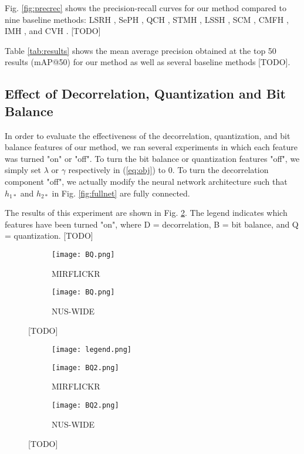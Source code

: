 \documentclass[letterpaper]{article}
\begin{document}
Fig. \ref{fig:precrec} shows the precision-recall curves for our method compared to nine baseline methods: LSRH \cite{kai}, SePH \cite{seph}, QCH \cite{qch}, STMH \cite{stmh}, LSSH \cite{lssh}, SCM \cite{scm}, CMFH \cite{cmfh}, IMH \cite{imh}, and CVH \cite{cvh}. [TODO]

Table \ref{tab:results} shows the mean average precision obtained at the top 50 results (mAP@50) for our method as well as several baseline methods [TODO]. 

\subsection{Effect of Decorrelation, Quantization and Bit Balance}

In order to evaluate the effectiveness of the decorrelation, quantization, and bit balance features of our method, we ran several experiments in which each feature was turned "on" or "off". To turn the bit balance or quantization features "off", we simply set $ \lambda $ or $ \gamma $ respectively in (\ref{eq:obj}) to 0. To turn the decorrelation component "off", we actually modify the neural network architecture such that $ h_{1*} $ and $ h_{2*} $ in Fig. \ref{fig:fullnet} are fully connected.

The results of this experiment are shown in Fig. \ref{fig:BQ2}. The legend indicates which features have been turned "on", where D = decorrelation, B = bit balance, and Q = quantization. [TODO]

\begin{figure}
	
	\begin{subfigure}{\columnwidth}
		\texttt{[image: BQ.png]}
		\caption{MIRFLICKR}
	\end{subfigure}
	\begin{subfigure}{\columnwidth}
		\texttt{[image: BQ.png]}
		\caption{NUS-WIDE}
	\end{subfigure}
	\caption{\label{fig:BQ}[TODO]}
	
\end{figure}

\begin{figure}
	
	\begin{subfigure}{\columnwidth}
		\centering
		\texttt{[image: legend.png]}
	\end{subfigure}	
	\begin{subfigure}{0.5\columnwidth}
		\texttt{[image: BQ2.png]}
		\caption{MIRFLICKR}
	\end{subfigure}
	\begin{subfigure}{0.5\columnwidth}
		\texttt{[image: BQ2.png]}
		\caption{NUS-WIDE}
	\end{subfigure}
	\caption{\label{fig:BQ2}[TODO]}
	
\end{figure}
\end{document}

